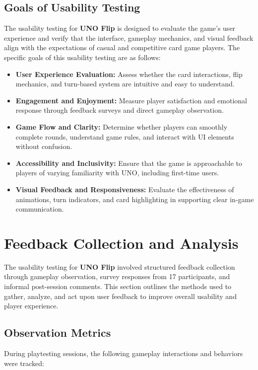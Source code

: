 \documentclass[12pt, titlepage]{article}
\begin{document}
\subsection{Goals of Usability Testing}
The usability testing for \textbf{UNO Flip} is designed to evaluate the game’s user experience and verify that the interface, gameplay mechanics, and visual feedback align with the expectations of casual and competitive card game players. The specific goals of this usability testing are as follows:

\begin{itemize}
    \item \textbf{User Experience Evaluation:} Assess whether the card interactions, flip mechanics, and turn-based system are intuitive and easy to understand.
    \item \textbf{Engagement and Enjoyment:} Measure player satisfaction and emotional response through feedback surveys and direct gameplay observation.
    \item \textbf{Game Flow and Clarity:} Determine whether players can smoothly complete rounds, understand game rules, and interact with UI elements without confusion.
    \item \textbf{Accessibility and Inclusivity:} Ensure that the game is approachable to players of varying familiarity with UNO, including first-time users.
    \item \textbf{Visual Feedback and Responsiveness:} Evaluate the effectiveness of animations, turn indicators, and card highlighting in supporting clear in-game communication.
\end{itemize}







\section{Feedback Collection and Analysis}

The usability testing for \textbf{UNO Flip} involved structured feedback collection through gameplay observation, survey responses from 17 participants, and informal post-session comments. This section outlines the methods used to gather, analyze, and act upon user feedback to improve overall usability and player experience.

\subsection{Observation Metrics}
During playtesting sessions, the following gameplay interactions and behaviors were tracked:
\end{document}
